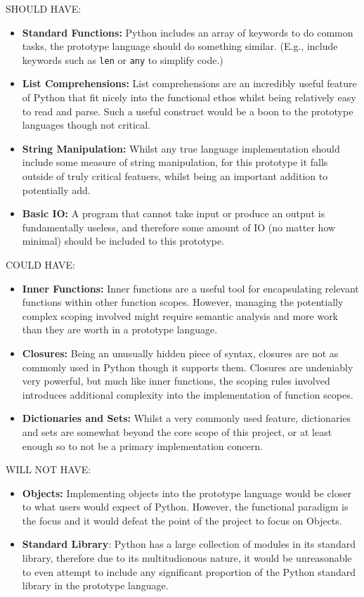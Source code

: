 \documentclass{l4proj}
\begin{document}
SHOULD HAVE:
\begin{itemize}
    \item \textbf{Standard Functions:} Python includes an array of keywords to do common tasks, the prototype language should do something similar.
    (E.g., include keywords such as \verb|len| or \verb|any| to simplify code.)
    \item \textbf{List Comprehensions:} List comprehensions are an incredibly useful feature of Python that fit nicely into the functional ethos whilst being relatively easy to read and parse.
    Such a useful construct would be a boon to the prototype languages though not critical.
    \item \textbf{String Manipulation:} Whilst any true language implementation should include some measure of string manipulation, for this prototype it falls outside of truly critical featuers, whilst being an important addition to potentially add.
    \item \textbf{Basic IO:} A program that cannot take input or produce an output is fundamentally useless, and therefore some amount of IO (no matter how minimal) should be included to this prototype.
\end{itemize}

COULD HAVE:
\begin{itemize}
    \item \textbf{Inner Functions:} Inner functions are a useful tool for encapsulating relevant functions within other function scopes.
    However, managing the potentially complex scoping involved might require semantic analysis and more work than they are worth in a prototype language.
    \item \textbf{Closures:} Being an unusually hidden piece of syntax, closures are not as commonly used in Python though it supports them.
    Closures are undeniably very powerful, but much like inner functions, the scoping rules involved introduces additional complexity into the implementation of function scopes. 
    \item \textbf{Dictionaries and Sets:} Whilst a very commonly used feature, dictionaries and sets are somewhat beyond the core scope of this project, or at least enough so to not be a primary implementation concern.
\end{itemize}

WILL NOT HAVE:
\begin{itemize}
    \item \textbf{Objects:} Implementing objects into the prototype language would be closer to what users would expect of Python. However, the functional paradigm is the focus and it would defeat the point of the project to focus on Objects.
    \item \textbf{Standard Library}: Python has a large collection of modules in its standard library, therefore due to its multitudionous nature, it would be unreasonable to even attempt to include any significant proportion of the Python standard library in the prototype language. 
\end{itemize}
\end{document}
